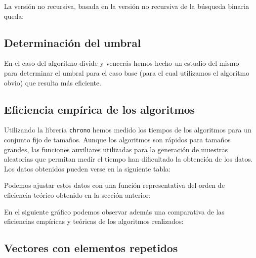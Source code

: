 La versión no recursiva, basada en la versión no recursiva de la búsqueda binaria queda:




\subsection{Determinación del umbral}

En el caso del algoritmo divide y vencerás hemos hecho un estudio del mismo para determinar el umbral para el caso base (para el cual utilizamos el algoritmo obvio) que resulta más eficiente.


\subsection{Eficiencia empírica de los algoritmos}

Utilizando la librería \texttt{chrono} hemos medido los tiempos de los algoritmos para un conjunto fijo de tamaños. Aunque los algoritmos son rápidos para tamaños grandes, las funciones auxiliares utilizadas para la generación de muestras aleatorias que permitan medir el tiempo han dificultado la obtención de los datos. Los datos obtenidos pueden verse en la siguiente tabla:

\vspace*{1cm}

\posObvio
{}\posDyV

 {\posObvio}

\pgfplotstabletypeset[
display columns/0/.style={column name=Tamaño},
display columns/1/.style={column name=Algoritmo Obvio},
display columns/2/.style={column name=Algoritmo DyV (r)},
skip rows between index={25}{50}
]{\posObvio}

\vspace*{1cm}

Podemos ajustar estos datos con una función representativa del orden de eficiencia teórico obtenido en la sección anterior:


En el siguiente gráfico podemos observar además una comparativa de las eficiencias empíricas y teóricas de los algoritmos realizados:


\subsection{Vectores con elementos repetidos}
